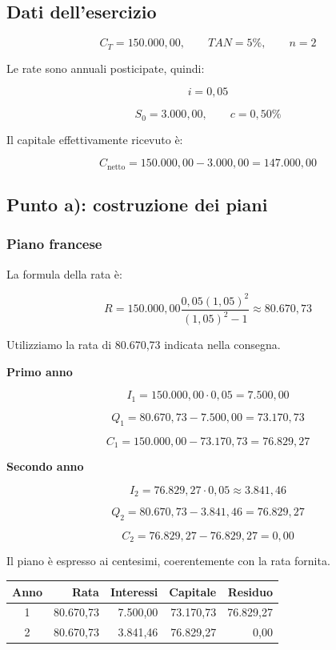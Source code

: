 \subsection*{Dati dell'esercizio}

\[
    C_T=150.000{,}00,
    \qquad TAN=5\%,
    \qquad n=2
\]

\noindent Le rate sono annuali posticipate, quindi:

\[
    i=0{,}05
\]

\[
    S_0=3.000{,}00,
    \qquad c=0{,}50\%
\]

\noindent Il capitale effettivamente ricevuto è:

\[
    C_{\text{netto}}
    =
    150.000{,}00-3.000{,}00
    =
    147.000{,}00
\]

\subsection{Punto a): costruzione dei piani}

\subsubsection*{Piano francese}

\noindent La formula della rata è:

\[
    R
    =
    150.000{,}00
    \frac{0{,}05(1{,}05)^2}{(1{,}05)^2-1}
    \approx80.670{,}73
\]

\noindent Utilizziamo la rata di 80.670,73 indicata nella consegna.

\textbf{Primo anno}

\[
    I_1=150.000{,}00\cdot0{,}05=7.500{,}00
\]

\[
    Q_1=80.670{,}73-7.500{,}00=73.170{,}73
\]

\[
    C_1=150.000{,}00-73.170{,}73=76.829{,}27
\]

\textbf{Secondo anno}

\[
    I_2=76.829{,}27\cdot0{,}05
    \approx3.841{,}46
\]

\[
    Q_2=80.670{,}73-3.841{,}46=76.829{,}27
\]

\[
    C_2=76.829{,}27-76.829{,}27=0{,}00
\]

\noindent Il piano è espresso ai centesimi, coerentemente
con la rata fornita.

\begin{center}
    \begin{tabular}{crrrr}
        \hline
        Anno & Rata & Interessi & Capitale & Residuo \\
        \hline
        1 & 80.670,73 & 7.500,00 & 73.170,73 & 76.829,27 \\
        2 & 80.670,73 & 3.841,46 & 76.829,27 & 0,00 \\
        \hline
    \end{tabular}
\end{center}

